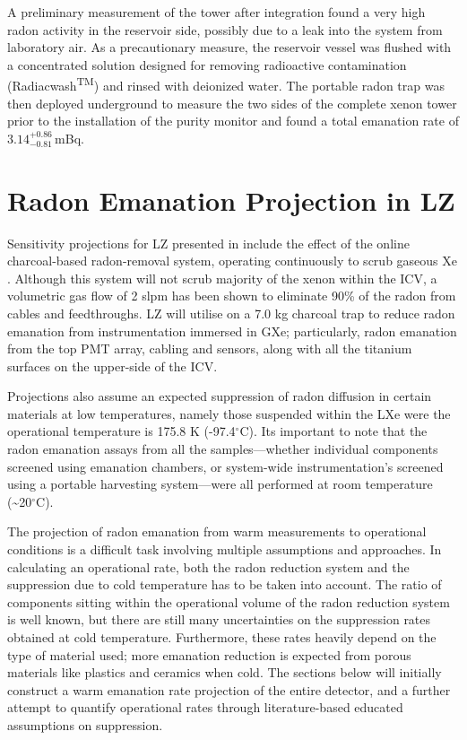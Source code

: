 A preliminary measurement of the tower after integration found a very high radon activity in the reservoir side, possibly due to a leak into the system from laboratory air. As a precautionary measure, the reservoir vessel was flushed with a concentrated solution designed for removing radioactive contamination (Radiacwash\textsuperscript{TM}) and rinsed with deionized water. The portable radon trap was then deployed underground to measure the two sides of the complete xenon tower prior to the installation of the purity monitor and found a total emanation rate of $3.14^{+0.86}_{-0.81}$\,mBq.


\section{Radon Emanation Projection in LZ}
\label{sec:lzradon}

Sensitivity projections for LZ presented in \cite{akerib2018projected} include the effect of the online charcoal-based radon-removal system, operating continuously to scrub gaseous Xe \cite{lz_tdr, Pushkin:2018wdl}. Although this system will not scrub majority of the xenon within the ICV, a volumetric gas flow of 2 slpm has been shown to eliminate 90\% of the radon from cables and feedthroughs. LZ will utilise on a 7.0 kg charcoal trap to reduce radon emanation from instrumentation immersed in GXe; particularly, radon emanation from the top PMT array, cabling and sensors, along with all the titanium surfaces on the upper-side of the ICV. 

Projections also assume an expected suppression of radon diffusion in certain materials at low temperatures, namely those suspended within the LXe were the operational temperature is 175.8 K (-97.4$^{\circ{}}$C). Its important to note that the radon emanation assays from all the samples---whether individual components screened using emanation chambers, or system-wide instrumentation's screened using a portable harvesting system---were all performed at room temperature (\sim{}20$^{\circ{}}$C).

The projection of radon emanation from warm measurements to operational conditions is a difficult task involving multiple assumptions and approaches. In calculating an operational rate, both the radon reduction system and the suppression due to cold temperature has to be taken into account. The ratio of components sitting within the operational volume of the radon reduction system is well known, but there are still many uncertainties on the suppression rates obtained at cold temperature. Furthermore, these rates heavily depend on the type of material used; more emanation reduction is expected from porous materials like plastics and ceramics when cold. The sections below will initially construct a warm emanation rate projection of the entire detector, and a further attempt to quantify operational rates through literature-based educated assumptions on suppression.  


